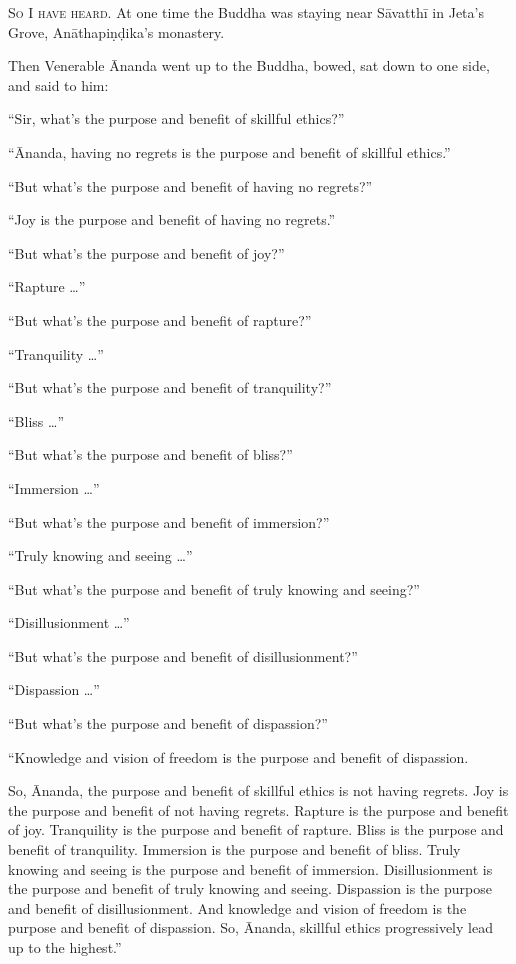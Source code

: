 \documentclass[12pt,openany]{book}%
\newcommand*{\scevam}[1]{\textsc{#1}}
\begin{document}
\scevam{So I have heard. }At one time the Buddha was staying near \textsanskrit{Sāvatthī} in Jeta’s Grove, \textsanskrit{Anāthapiṇḍika}’s monastery. 

Then Venerable Ānanda went up to the Buddha, bowed, sat down to one side, and said to him: 

“Sir, what’s the purpose and benefit of skillful ethics?” 

“Ānanda, having no regrets is the purpose and benefit of skillful ethics.” 

“But what’s the purpose and benefit of having no regrets?” 

“Joy is the purpose and benefit of having no regrets.” 

“But what’s the purpose and benefit of joy?” 

“Rapture …” 

“But what’s the purpose and benefit of rapture?” 

“Tranquility …” 

“But what’s the purpose and benefit of tranquility?” 

“Bliss …” 

“But what’s the purpose and benefit of bliss?” 

“Immersion …” 

“But what’s the purpose and benefit of immersion?” 

“Truly knowing and seeing …” 

“But what’s the purpose and benefit of truly knowing and seeing?” 

“Disillusionment …” 

“But what’s the purpose and benefit of disillusionment?” 

“Dispassion …” 

“But what’s the purpose and benefit of dispassion?” 

“Knowledge and vision of freedom is the purpose and benefit of dispassion. 

So, Ānanda, the purpose and benefit of skillful ethics is not having regrets. Joy is the purpose and benefit of not having regrets. Rapture is the purpose and benefit of joy. Tranquility is the purpose and benefit of rapture. Bliss is the purpose and benefit of tranquility. Immersion is the purpose and benefit of bliss. Truly knowing and seeing is the purpose and benefit of immersion. Disillusionment is the purpose and benefit of truly knowing and seeing. Dispassion is the purpose and benefit of disillusionment. And knowledge and vision of freedom is the purpose and benefit of dispassion. So, Ānanda, skillful ethics progressively lead up to the highest.” 
\end{document}
